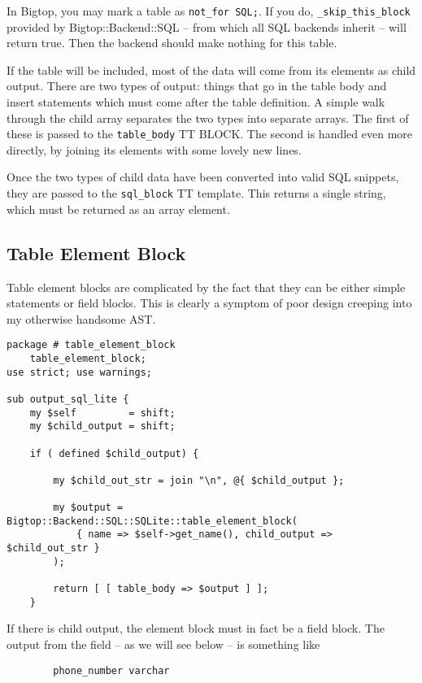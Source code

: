 In Bigtop, you may mark a table as \verb+not_for SQL;+.  If you do,
\verb+_skip_this_block+ provided by Bigtop::Backend::SQL -- from which
all SQL backends inherit -- will return true.  Then the backend should
make nothing for this table.

If the table will be included, most of the data will come from its
elements as child output.  There are two types of output: things that
go in the table body and insert statements which must come after the table
definition.  A simple walk through the child array separates the two
types into separate arrays.  The first of these is passed to the
\verb+table_body+ TT BLOCK.  The second is handled even more directly,
by joining its elements with some lovely new lines.

Once the two types of child data have been converted into valid SQL
snippets, they are passed to the \verb+sql_block+ TT template.
This returns a single string, which must be returned as an array element.

\subsection*{Table Element Block}

Table element blocks are complicated by the fact that they can be either
simple statements or field blocks.  This is clearly a symptom of poor design
creeping into my otherwise handsome AST.

\begin{verbatim}
package # table_element_block
    table_element_block;
use strict; use warnings;

sub output_sql_lite {
    my $self         = shift;
    my $child_output = shift;

    if ( defined $child_output) {

        my $child_out_str = join "\n", @{ $child_output };

        my $output = Bigtop::Backend::SQL::SQLite::table_element_block(
            { name => $self->get_name(), child_output => $child_out_str }
        );

        return [ [ table_body => $output ] ];
    }
\end{verbatim}

If there is child output, the element block must in fact be a field block.
The output from the field -- as we will see below -- is something like

\begin{verbatim}
        phone_number varchar
\end{verbatim}

